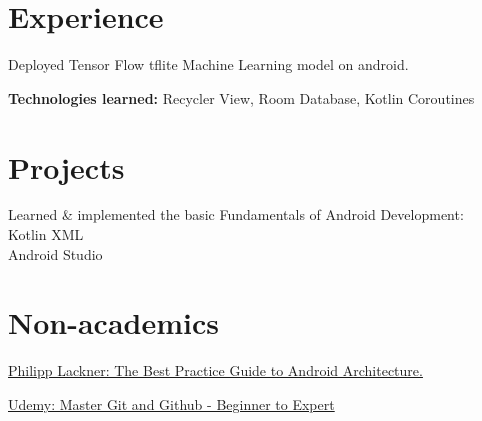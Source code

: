 \documentclass[]{deedy-resume-openfont}
\begin{document}
\begin{minipage}[t]{0.66\textwidth} 


\section{Experience}

\vspace{\topsep} %
\begin{tightemize}
\item Deployed Tensor Flow tflite Machine Learning model on android.
\item \textbf{Technologies learned: } Recycler View, Room Database, Kotlin Coroutines
\end{tightemize}
\sectionsep







\section{Projects}

\begin{tightemize}
\item Learned \& implemented the basic Fundamentals of Android Development: \\
\quad \textbullet{} Kotlin \textbullet{} XML \\
\quad \textbullet{} Android Studio \\
\end{tightemize}
\sectionsep




\section{Non-academics}
\begin{tightemize} 
\item \href{https://pl-coding.com/best-practice-guide}{Philipp Lackner: The Best Practice Guide to Android Architecture.}
\item \href{https://www.udemy.com/certificate/UC-b3157d51-19c3-4510-a924-2206bc5a0903/}{Udemy: Master Git and Github - Beginner to Expert}
\end{tightemize}
\sectionsep




\end{minipage}
\end{document}
